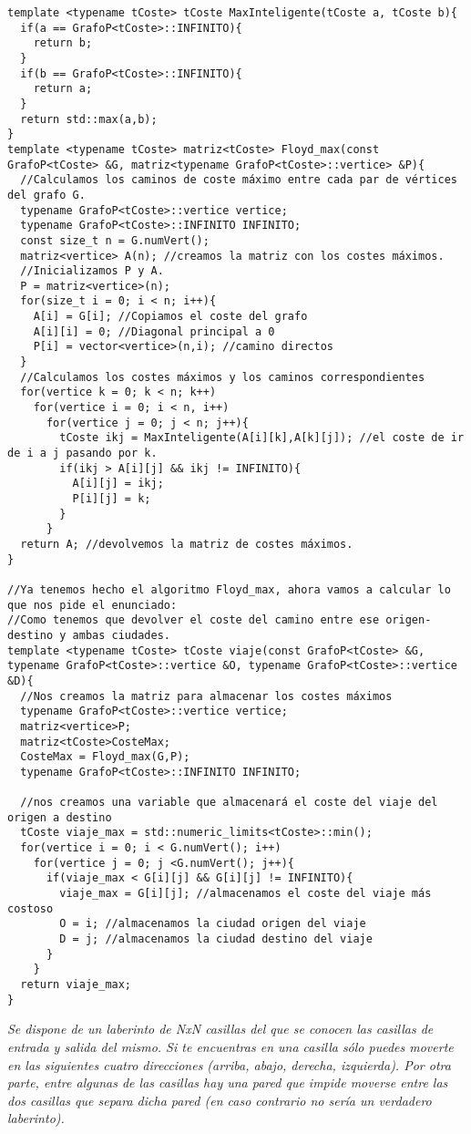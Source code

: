 \begin{verbatim}
template <typename tCoste> tCoste MaxInteligente(tCoste a, tCoste b){
  if(a == GrafoP<tCoste>::INFINITO){
    return b;
  }
  if(b == GrafoP<tCoste>::INFINITO){
    return a;
  }
  return std::max(a,b);
}
template <typename tCoste> matriz<tCoste> Floyd_max(const GrafoP<tCoste> &G, matriz<typename GrafoP<tCoste>::vertice> &P){
  //Calculamos los caminos de coste máximo entre cada par de vértices del grafo G.
  typename GrafoP<tCoste>::vertice vertice;
  typename GrafoP<tCoste>::INFINITO INFINITO;
  const size_t n = G.numVert();
  matriz<vertice> A(n); //creamos la matriz con los costes máximos.
  //Inicializamos P y A.
  P = matriz<vertice>(n);
  for(size_t i = 0; i < n; i++){
    A[i] = G[i]; //Copiamos el coste del grafo
    A[i][i] = 0; //Diagonal principal a 0
    P[i] = vector<vertice>(n,i); //camino directos
  }
  //Calculamos los costes máximos y los caminos correspondientes
  for(vertice k = 0; k < n; k++)
    for(vertice i = 0; i < n, i++)
      for(vertice j = 0; j < n; j++){
        tCoste ikj = MaxInteligente(A[i][k],A[k][j]); //el coste de ir de i a j pasando por k.
        if(ikj > A[i][j] && ikj != INFINITO){
          A[i][j] = ikj;
          P[i][j] = k;
        }
      }
  return A; //devolvemos la matriz de costes máximos.
}

//Ya tenemos hecho el algoritmo Floyd_max, ahora vamos a calcular lo que nos pide el enunciado:
//Como tenemos que devolver el coste del camino entre ese origen-destino y ambas ciudades.
template <typename tCoste> tCoste viaje(const GrafoP<tCoste> &G, typename GrafoP<tCoste>::vertice &O, typename GrafoP<tCoste>::vertice &D){
  //Nos creamos la matriz para almacenar los costes máximos
  typename GrafoP<tCoste>::vertice vertice;
  matriz<vertice>P;
  matriz<tCoste>CosteMax;
  CosteMax = Floyd_max(G,P);
  typename GrafoP<tCoste>::INFINITO INFINITO;

  //nos creamos una variable que almacenará el coste del viaje del origen a destino
  tCoste viaje_max = std::numeric_limits<tCoste>::min();
  for(vertice i = 0; i < G.numVert(); i++)
    for(vertice j = 0; j <G.numVert(); j++){
      if(viaje_max < G[i][j] && G[i][j] != INFINITO){
        viaje_max = G[i][j]; //almacenamos el coste del viaje más costoso
        O = i; //almacenamos la ciudad origen del viaje
        D = j; //almacenamos la ciudad destino del viaje
      }
    }
  return viaje_max;
}
\end{verbatim}

\textbf{\large{}}\textit{ Se dispone de un laberinto de NxN casillas del que se conocen las casillas de entrada y salida del mismo. Si te encuentras en una casilla sólo puedes moverte en las siguientes cuatro direcciones (arriba, abajo, derecha, izquierda). Por otra parte, entre algunas de las casillas hay una pared que impide moverse entre las dos casillas que separa dicha pared (en caso contrario no sería un verdadero laberinto).}

